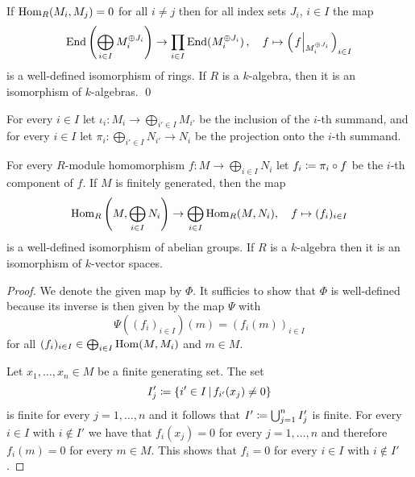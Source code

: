 \begin{corollary}
  \label{corollary: decomposition of endomorphism ring into product including sums}
  If $\operatorname{Hom}_R(M_i, M_j) = 0$ for all $i \neq j$ then for all index sets $J_i$, $i \in I$ the map
  \[
            \End\left( \bigoplus_{i \in I} M_i^{\oplus J_i} \right)
    \to     \prod_{i \in I} \End( M_i^{\oplus J_i} ) \,,
    \quad   f
    \mapsto \left( \restrict*{f}{M_i^{\oplus J_i}} \right)_{i \in I}
  \]
  is a well-defined isomorphism of rings.
  If $R$ is a $k$-algebra, then it is an isomorphism of $k$-algebras.
  \qed
\end{corollary}


\begin{fluff}
  For every $i \in I$ let $\iota_i \colon M_i \to \bigoplus_{i' \in I} M_{i'}$ be the inclusion of the $i$-th summand, and for every $i \in I$ let $\pi_i \colon \bigoplus_{i' \in I} N_{i'} \to N_i$ be the projection onto the $i$-th summand.
\end{fluff}


\begin{lemma}
  \label{lemma: hom is additive for fg modules}
  For every $R$-module homomorphism $f \colon M \to \bigoplus_{i \in I} N_i$ let $f_i \coloneqq \pi_i \circ f$ be the $i$-th component of $f$.
  If $M$ is finitely generated, then the map
  \[
            \operatorname{Hom}_R\left( M, \bigoplus_{i \in I} N_i \right)
    \to     \bigoplus_{i \in I} \operatorname{Hom}_R(M, N_i),
    \quad   f
    \mapsto (f_i)_{i \in I}
  \]
  is a well-defined isomorphism of abelian groups.
  If $R$ is a $k$-algebra then it is an isomorphism of $k$-vector spaces.
\end{lemma}


\begin{proof}
  We denote the given map by $\Phi$.
  It sufficies to show that $\Phi$ is well-defined because its inverse is then given by the map $\Psi$ with
  \[
      \Psi((f_i)_{i \in I})(m)
    = ( f_i(m) )_{i \in I}
  \]
  for all $(f_i)_{i \in I} \in \bigoplus_{i \in I} \operatorname{Hom}(M, M_i)$ and $m \in M$.
  
  Let $x_1, \dotsc, x_n \in M$ be a finite generating set.
  The set
  \[
              I'_j
    \defined \{
                i' \in I
              \suchthat
                f_{i'}(x_j) \neq 0
              \}
  \]
  is finite for every $j = 1, \dotsc, n$ and it follows that $I' \coloneqq \bigcup_{j=1}^n I'_j$ is finite.
  For every $i \in I$ with $i \notin I'$ we have that $f_i(x_j) = 0$ for every $j = 1, \dotsc, n$ and therefore $f_i(m) = 0$ for every $m \in M$.
  This shows that $f_i = 0$ for every $i \in I$ with $i \notin I'$.
\end{proof}


